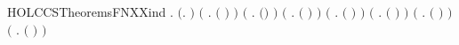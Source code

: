 \begin{SaveVerbatim}{HOLCCSTheoremsFNXXind}
\HOLTokenTurnstile{} \HOLSymConst{\HOLTokenForall{}}.
       \ensuremath{(}\HOLSymConst{\HOLTokenForall{}}.   \ensuremath{)} \HOLSymConst{\HOLTokenConj{}} \ensuremath{(}\HOLSymConst{\HOLTokenForall{}}  .    \HOLSymConst{\HOLTokenImp{}}  \ensuremath{(} \HOLSymConst{\ensuremath{\ldotp}}\ensuremath{)} \ensuremath{)} \HOLSymConst{\HOLTokenConj{}}
       \ensuremath{(}\HOLSymConst{\HOLTokenForall{}} .    \HOLSymConst{\HOLTokenImp{}}  \ensuremath{(}\HOLConst{\ensuremath{\tau}}\HOLSymConst{\ensuremath{\ldotp}}\ensuremath{)} \ensuremath{)} \HOLSymConst{\HOLTokenConj{}}
       \ensuremath{(}\HOLSymConst{\HOLTokenForall{}}  .    \HOLSymConst{\HOLTokenConj{}}    \HOLSymConst{\HOLTokenImp{}}  \ensuremath{(} \HOLSymConst{\ensuremath{+}} \ensuremath{)} \ensuremath{)} \HOLSymConst{\HOLTokenConj{}}
       \ensuremath{(}\HOLSymConst{\HOLTokenForall{}}  .    \HOLSymConst{\HOLTokenConj{}}    \HOLSymConst{\HOLTokenImp{}}  \ensuremath{(} \HOLSymConst{\ensuremath{\mid}} \ensuremath{)} \ensuremath{)} \HOLSymConst{\HOLTokenConj{}}
       \ensuremath{(}\HOLSymConst{\HOLTokenForall{}}  .    \HOLSymConst{\HOLTokenImp{}}  \ensuremath{(}  \ensuremath{)} \ensuremath{)} \HOLSymConst{\HOLTokenConj{}}
       \ensuremath{(}\HOLSymConst{\HOLTokenForall{}}  .    \HOLSymConst{\HOLTokenImp{}}  \ensuremath{(}  \ensuremath{)} \ensuremath{)} \HOLSymConst{\HOLTokenConj{}}
       \ensuremath{(}\HOLSymConst{\HOLTokenForall{}} .  \ensuremath{(} \ensuremath{)} \ensuremath{)} \HOLSymConst{\HOLTokenConj{}}

\end{SaveVerbatim}
